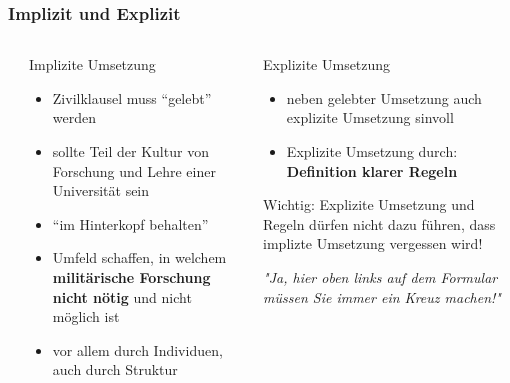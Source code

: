 \documentclass[presentation]{beamer}
\providecommand{\alert}[1]{\textbf{#1}}
\begin{document}
\begin{frame}
\frametitle{Implizit und Explizit}
\label{sec-4-4}
\begin{columns}[t] %
\label{sec-4-4-1}
\begin{column}{0.48\textwidth}
\begin{block}{Implizite Umsetzung}
\label{sec-4-4-1-1}

\fontsize{10pt}{12}\selectfont
\begin{itemize}
\item Zivilklausel muss ``gelebt'' werden
\item sollte Teil der Kultur von Forschung und Lehre einer Universität sein
\item ``im Hinterkopf behalten''
\item Umfeld schaffen, in welchem \alert{militärische Forschung nicht nötig} und nicht möglich ist
\item vor allem durch Individuen, auch durch Struktur
\end{itemize}
\end{block}
\end{column}
\begin{column}{0.48\textwidth}
\begin{block}{Explizite Umsetzung}
\label{sec-4-4-1-2}

\fontsize{10pt}{12}\selectfont
\begin{itemize}
\item neben gelebter Umsetzung auch explizite Umsetzung sinvoll
\item Explizite Umsetzung durch: \alert{Definition klarer Regeln}
\end{itemize}
     Wichtig: Explizite Umsetzung und Regeln dürfen nicht dazu führen, dass implizte Umsetzung vergessen wird!
\begin{center}
     \emph{"Ja, hier oben links auf dem Formular müssen Sie immer ein Kreuz machen!"}
\end{center}
\end{block}
\end{column}
\end{columns}
\end{frame}
\end{document}
